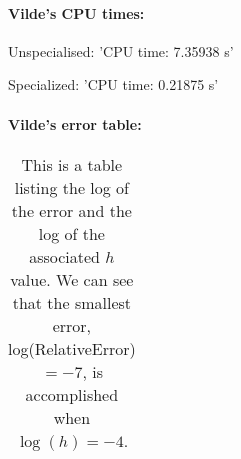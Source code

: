 \paragraph{Vilde's CPU times:\hspace{4cm}}

\hspace{1cm}\linebreak

Unspecialised: 'CPU time: 7.35938 s'

Specialized: 'CPU time: 0.21875 s'

\paragraph{Vilde's error table:\hspace{4cm}}

\hspace{1cm}\linebreak

\begin{table}\caption{This is a table listing the log of the error and the log of the associated $h$ value. We can see that the smallest error, log(RelativeError) $= -7$, is accomplished when $\log(h) = -4$.}
\begin{tabular}{cc}

\end{tabular}
\end{table}